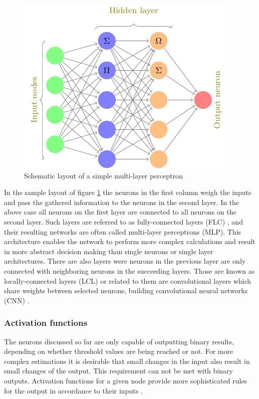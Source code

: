 \begin{figure}[H]
\centering
\includegraphics[height=.25\textheight, width=.5\textwidth]{Figures/neuralnet}
\decoRule
\caption[Schematic layout of a simple multi-layer perceptron]{Schematic layout of a simple multi-layer perceptron}
\label{fig:nn}
\end{figure}


In the sample layout of figure \ref{fig:nn} the neurons in the first column weigh the inputs and pass the
gathered information to the neurons in the second layer. In the above case  all neurons on the first layer are
connected to all neurons on the second layer. Such layers are referred to as fully-connected layers (FLC) , and
their resulting networks are often called multi-layer perceptrons (MLP). This architecture enables the network
to perform more complex calculations and result in more abstract decision making than single neurons or single layer
architectures. There are also layers were neurons in the previous layer are only connected with neighboring
neurons in the succeeding layers. Those are known as locally-connected layers (LCL) or related to them are
convolutional layers which share weights between selected neurons, building convolutional neural networks
(CNN) \cite{lecun1999object}.

\subsubsection{Activation functions}

The neurons discussed so far are only capable of outputting binary results, depending on
whether threshold values are being reached or not. For more complex estimations it is desirable that small
changes in the input also result in small changes of the output. This requirement can not be met with binary
outputs. Activation functions for a given node provide more sophisticated rules for the output in accordance
to their inputs \cite{vzilinskas2006practical}.

